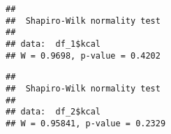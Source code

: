 \documentclass[
]{article}
\newenvironment{Shaded}{\begin{snugshade}}{\end{snugshade}}
\newcommand{\DecValTok}[1]{\textcolor[rgb]{0.00,0.00,0.81}{#1}}
\newcommand{\KeywordTok}[1]{\textcolor[rgb]{0.13,0.29,0.53}{\textbf{#1}}}
\newcommand{\NormalTok}[1]{#1}
\newcommand{\OperatorTok}[1]{\textcolor[rgb]{0.81,0.36,0.00}{\textbf{#1}}}
\begin{document}
\begin{Shaded}
\end{Shaded}

\begin{verbatim}
## 
##  Shapiro-Wilk normality test
## 
## data:  df_1$kcal
## W = 0.9698, p-value = 0.4202
\end{verbatim}

\begin{Shaded}
\end{Shaded}

\begin{verbatim}
## 
##  Shapiro-Wilk normality test
## 
## data:  df_2$kcal
## W = 0.95841, p-value = 0.2329
\end{verbatim}
\end{document}
